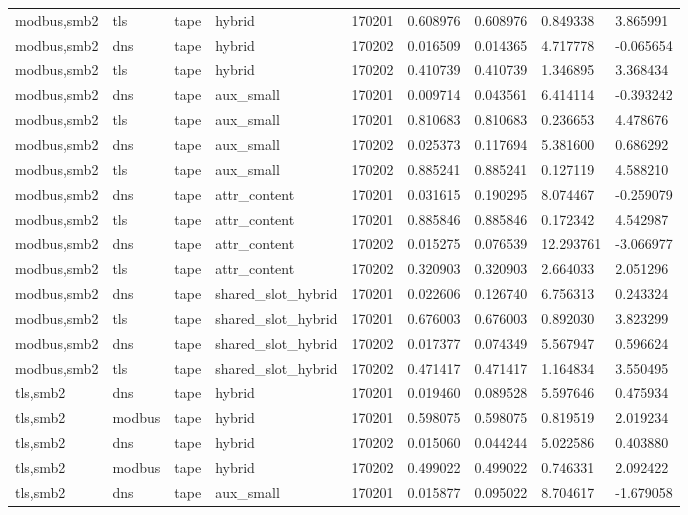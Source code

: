 \begin{tabular}{lllllllll}
modbus,smb2 & tls & tape & hybrid & 170201 & 0.608976 & 0.608976 & 0.849338 & 3.865991 \\
modbus,smb2 & dns & tape & hybrid & 170202 & 0.016509 & 0.014365 & 4.717778 & -0.065654 \\
modbus,smb2 & tls & tape & hybrid & 170202 & 0.410739 & 0.410739 & 1.346895 & 3.368434 \\
modbus,smb2 & dns & tape & aux\_small & 170201 & 0.009714 & 0.043561 & 6.414114 & -0.393242 \\
modbus,smb2 & tls & tape & aux\_small & 170201 & 0.810683 & 0.810683 & 0.236653 & 4.478676 \\
modbus,smb2 & dns & tape & aux\_small & 170202 & 0.025373 & 0.117694 & 5.381600 & 0.686292 \\
modbus,smb2 & tls & tape & aux\_small & 170202 & 0.885241 & 0.885241 & 0.127119 & 4.588210 \\
modbus,smb2 & dns & tape & attr\_content & 170201 & 0.031615 & 0.190295 & 8.074467 & -0.259079 \\
modbus,smb2 & tls & tape & attr\_content & 170201 & 0.885846 & 0.885846 & 0.172342 & 4.542987 \\
modbus,smb2 & dns & tape & attr\_content & 170202 & 0.015275 & 0.076539 & 12.293761 & -3.066977 \\
modbus,smb2 & tls & tape & attr\_content & 170202 & 0.320903 & 0.320903 & 2.664033 & 2.051296 \\
modbus,smb2 & dns & tape & shared\_slot\_hybrid & 170201 & 0.022606 & 0.126740 & 6.756313 & 0.243324 \\
modbus,smb2 & tls & tape & shared\_slot\_hybrid & 170201 & 0.676003 & 0.676003 & 0.892030 & 3.823299 \\
modbus,smb2 & dns & tape & shared\_slot\_hybrid & 170202 & 0.017377 & 0.074349 & 5.567947 & 0.596624 \\
modbus,smb2 & tls & tape & shared\_slot\_hybrid & 170202 & 0.471417 & 0.471417 & 1.164834 & 3.550495 \\
tls,smb2 & dns & tape & hybrid & 170201 & 0.019460 & 0.089528 & 5.597646 & 0.475934 \\
tls,smb2 & modbus & tape & hybrid & 170201 & 0.598075 & 0.598075 & 0.819519 & 2.019234 \\
tls,smb2 & dns & tape & hybrid & 170202 & 0.015060 & 0.044244 & 5.022586 & 0.403880 \\
tls,smb2 & modbus & tape & hybrid & 170202 & 0.499022 & 0.499022 & 0.746331 & 2.092422 \\
tls,smb2 & dns & tape & aux\_small & 170201 & 0.015877 & 0.095022 & 8.704617 & -1.679058 \\

\end{tabular}

